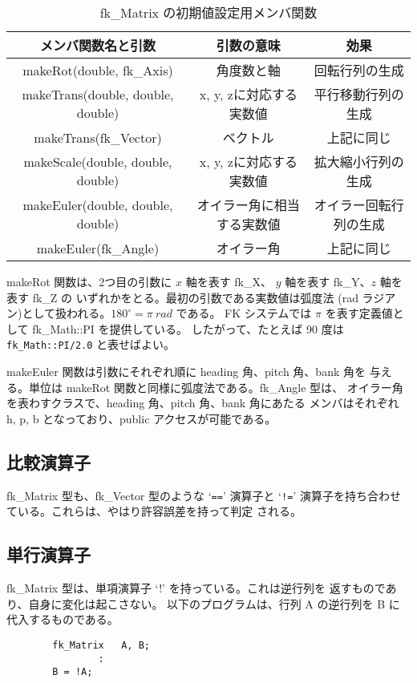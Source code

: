 \begin{table}[H]
\caption{fk\_Matrix の初期値設定用メンバ関数}
\label{tbl:fkMat1}
\begin{center}
\begin{tabular}{|c|c|c|}
\hline
メンバ関数名と引数 & 引数の意味 & 効果 \\ \hline \hline
makeRot(double, fk\_Axis) & 角度数と軸 &
        回転行列の生成 \\ \hline
makeTrans(double, double, double) &
        x, y, zに対応する実数値 & 平行移動行列の生成 \\ \hline
makeTrans(fk\_Vector) & ベクトル & 上記に同じ \\ \hline
makeScale(double, double, double) &
        x, y, zに対応する実数値 & 拡大縮小行列の生成 \\ \hline
makeEuler(double, double, double) & オイラー角に相当する実数値 &
        オイラー回転行列の生成 \\ \hline
makeEuler(fk\_Angle) & オイラー角 & 上記に同じ \\ \hline
\end{tabular}
\end{center}
\end{table}

makeRot 関数は、2つ目の引数に \(x\) 軸を表す fk\_X、
\(y\) 軸を表す fk\_Y、\(z\) 軸を表す fk\_Z の
いずれかをとる。最初の引数である実数値は弧度法
(rad ラジアン)として扱われる。\(180^\circ = \pi \: rad\) である。
FK システムでは \(\pi\) を表す定義値として fk\_Math::PI を提供している。
したがって、たとえば 90 度は \verb+fk_Math::PI/2.0+ と表せばよい。

makeEuler 関数は引数にそれぞれ順に heading 角、pitch 角、bank 角を
与える。単位は makeRot 関数と同様に弧度法である。fk\_Angle 型は、
オイラー角を表わすクラスで、heading 角、pitch 角、bank 角にあたる
メンバはそれぞれ h, p, b となっており、public アクセスが可能である。
\subsection{比較演算子}
fk\_Matrix 型も、fk\_Vector 型のような `\verb+==+' 演算子と `\verb+!=+'
演算子を持ち合わせている。これらは、やはり許容誤差を持って判定
される。
\subsection{単行演算子}
fk\_Matrix 型は、単項演算子 `!' を持っている。これは逆行列を
返すものであり、自身に変化は起こさない。
以下のプログラムは、行列 A の逆行列を B に代入するものである。
\\
\begin{screen}
\begin{verbatim}
        fk_Matrix   A, B;
                :
        B = !A;
\end{verbatim}
\end{screen}

